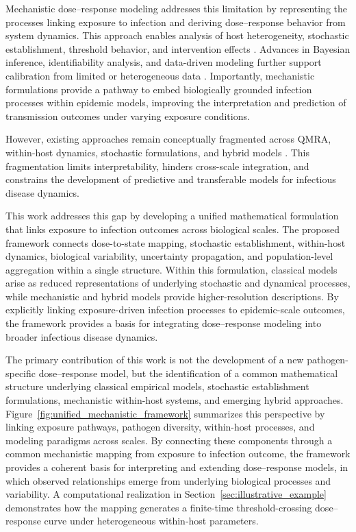 \documentclass[11pt]{article}
\begin{document}
Mechanistic dose--response modeling addresses this limitation by representing the processes linking exposure to infection and deriving dose--response behavior from system dynamics. This approach enables analysis of host heterogeneity, stochastic establishment, threshold behavior, and intervention effects \cite{Rahman2018AdvancingRiskAssessment,Gostic2019Leptospira,Abe2021CampyNewDoseResponse}. Advances in Bayesian inference, identifiability analysis, and data-driven modeling further support calibration from limited or heterogeneous data \cite{Gutting2013,Sunnaker2013ABCReview,Toni2009ABC}. Importantly, mechanistic formulations provide a pathway to embed biologically grounded infection processes within epidemic models, improving the interpretation and prediction of transmission outcomes under varying exposure conditions.

However, existing approaches remain conceptually fragmented across QMRA, within-host dynamics, stochastic formulations, and hybrid models \cite{Hamilton2024QMRAGaps,Handel2015CrossingScale}. This fragmentation limits interpretability, hinders cross-scale integration, and constrains the development of predictive and transferable models for infectious disease dynamics.

This work addresses this gap by developing a unified mathematical formulation
that links exposure to infection outcomes across biological scales. The
proposed framework connects dose-to-state mapping, stochastic establishment,
within-host dynamics, biological variability, uncertainty propagation, and
population-level aggregation within a single structure.  Within this formulation, classical models arise as reduced representations of underlying stochastic and dynamical processes, while mechanistic and hybrid models provide higher-resolution descriptions. By explicitly linking exposure-driven infection processes to epidemic-scale outcomes, the framework provides a basis for integrating dose--response modeling into broader infectious disease dynamics.

The primary contribution of this work is not the development of a new pathogen-specific dose--response model, but the identification of a common mathematical structure underlying classical empirical models, stochastic establishment formulations, mechanistic within-host systems, and emerging hybrid approaches. Figure~\ref{fig:unified_mechanistic_framework} summarizes this perspective by linking exposure pathways, pathogen diversity, within-host processes, and modeling paradigms across scales. By connecting these components through a common mechanistic mapping from exposure to infection outcome, the framework provides a coherent basis for interpreting and extending dose–response models, in which observed relationships emerge from underlying biological processes and variability. A computational realization in Section~\ref{sec:illustrative_example} demonstrates how the mapping generates a finite-time threshold-crossing dose--response curve under heterogeneous within-host parameters.
\end{document}
